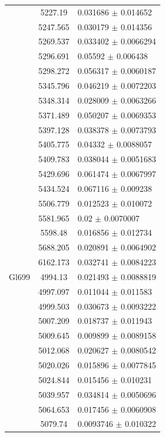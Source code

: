 \begin{longtable}{|c|c|l|}
 & 5227.19 & 0.031686 $\pm$ 0.014652 \\         
 & 5247.565 & 0.030179 $\pm$ 0.014356 \\        
 & 5269.537 & 0.033402 $\pm$ 0.0066294 \\       
 & 5296.691 & 0.05592 $\pm$ 0.006438 \\         
 & 5298.272 & 0.056317 $\pm$ 0.0060187 \\       
 & 5345.796 & 0.046219 $\pm$ 0.0072203 \\       
 & 5348.314 & 0.028009 $\pm$ 0.0063266 \\       
 & 5371.489 & 0.050207 $\pm$ 0.0069353 \\       
 & 5397.128 & 0.038378 $\pm$ 0.0073793 \\       
 & 5405.775 & 0.04332 $\pm$ 0.0088057 \\        
 & 5409.783 & 0.038044 $\pm$ 0.0051683 \\       
 & 5429.696 & 0.061474 $\pm$ 0.0067997 \\       
 & 5434.524 & 0.067116 $\pm$ 0.009238 \\        
 & 5506.779 & 0.012523 $\pm$ 0.010072 \\        
 & 5581.965 & 0.02 $\pm$ 0.0070007 \\           
 & 5598.48 & 0.016856 $\pm$ 0.012734 \\         
 & 5688.205 & 0.020891 $\pm$ 0.0064902 \\       
 & 6162.173 & 0.032741 $\pm$ 0.0084223 \\       
\hline                                          
Gl699 & 4994.13 & 0.021493 $\pm$ 0.0088819 \\   
 & 4997.097 & 0.011044 $\pm$ 0.011583 \\        
 & 4999.503 & 0.030673 $\pm$ 0.0093222 \\       
 & 5007.209 & 0.018737 $\pm$ 0.011943 \\        
 & 5009.645 & 0.009899 $\pm$ 0.0089158 \\       
 & 5012.068 & 0.020627 $\pm$ 0.0080542 \\       
 & 5020.026 & 0.015896 $\pm$ 0.0077845 \\       
 & 5024.844 & 0.015456 $\pm$ 0.010231 \\        
 & 5039.957 & 0.034814 $\pm$ 0.0050696 \\       
 & 5064.653 & 0.017456 $\pm$ 0.0060908 \\       
 & 5079.74 & 0.0093746 $\pm$ 0.010322 \\        

\end{longtable}
